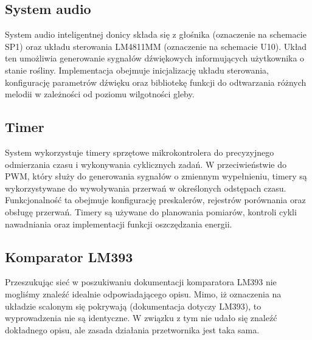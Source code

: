 \documentclass{article}
\begin{document}






\subsection{System audio}
System audio inteligentnej donicy składa się z głośnika (oznaczenie na schemacie SP1) oraz układu sterowania LM4811MM (oznaczenie na schemacie U10). Układ ten umożliwia generowanie sygnałów dźwiękowych informujących użytkownika o stanie rośliny. Implementacja obejmuje inicjalizację układu sterowania, konfigurację parametrów dźwięku oraz bibliotekę funkcji do odtwarzania różnych melodii w zależności od poziomu wilgotności gleby.


\subsection{Timer}
System wykorzystuje timery sprzętowe mikrokontrolera do precyzyjnego odmierzania czasu i wykonywania cyklicznych zadań. W przeciwieństwie do PWM, który służy do generowania sygnałów o zmiennym wypełnieniu, timery są wykorzystywane do wywoływania przerwań w określonych odstępach czasu. Funkcjonalność ta obejmuje konfigurację preskalerów, rejestrów porównania oraz obsługę przerwań. Timery są używane do planowania pomiarów, kontroli cykli nawadniania oraz implementacji funkcji oszczędzania energii.











\subsection{Komparator LM393}
Przeszukując sieć w poszukiwaniu dokumentacji komparatora LM393 nie mogliśmy znaleźć idealnie odpowiadającego opisu. Mimo, iż oznaczenia na układzie scalonym się pokrywają (dokumentacja dotyczy LM393), to wyprowadzenia nie są identyczne. W związku z tym nie udało się znaleźć dokładnego opisu, ale zasada działania przetwornika jest taka sama. 
\end{document}
